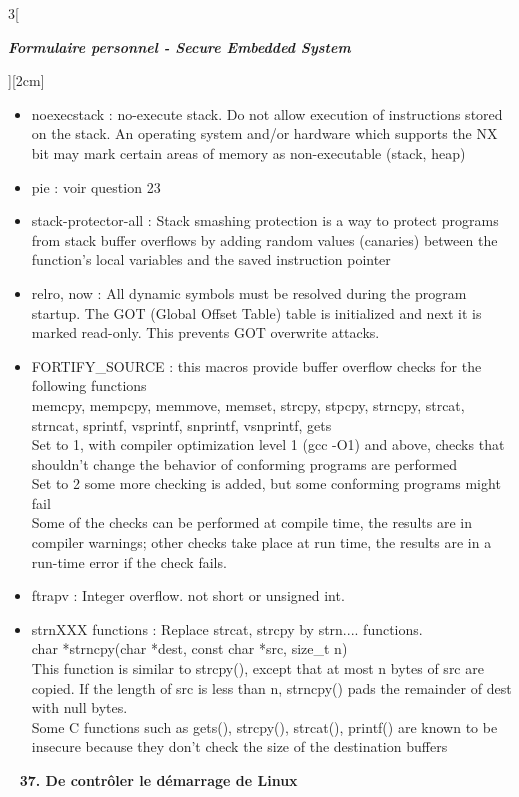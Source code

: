 \begin{multicols}{3}[\centerline{ \large\em \textbf{Formulaire personnel - Secure Embedded System}}][2cm]
\begin{itemize}
\item noexecstack : no-execute stack. Do not allow execution of instructions stored on the stack. An operating system and/or hardware which supports the NX bit may mark certain areas of memory as non-executable (stack, heap)
\item pie : voir question 23
\item stack-protector-all : Stack smashing protection is a way to protect programs from stack buffer overflows by adding random values (canaries) between the function’s local variables and the saved instruction pointer
\item relro, now : All dynamic symbols must be resolved during the program startup. The GOT (Global Offset Table) table is initialized and next it is marked read-only. This prevents GOT overwrite attacks.
\item FORTIFY\_SOURCE : this macros provide buffer overflow checks for the following functions \\
memcpy, mempcpy, memmove, memset, strcpy, stpcpy, strncpy, strcat, strncat, sprintf, vsprintf, snprintf, vsnprintf, gets\\
Set to 1, with compiler optimization level 1 (gcc -O1) and above,
checks that shouldn’t change the behavior of conforming programs are performed\\
Set to 2 some more checking is added, but some conforming programs might fail\\
Some of the checks can be performed at compile time, the results are in compiler warnings; other checks take place at run time, the results are in a run-time error if the check fails. 
\item ftrapv : Integer overflow. not short or unsigned int.
\item strnXXX functions : Replace strcat, strcpy by strn.... functions. \\
char *strncpy(char *dest, const char *src, size\_t n)\\
This function is similar to strcpy(), except that at most n bytes of src are copied. If the length of src is less than n, strncpy() pads the remainder of dest with null bytes. \\
Some C functions such as gets(), strcpy(), strcat(), printf() are known to be
insecure because they don’t check the size of the destination buffers
\end{itemize}~
\textbf{37. De contrôler le démarrage de Linux\\}

\end{multicols}
